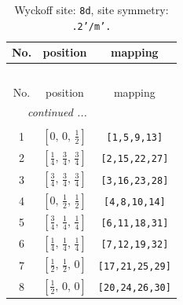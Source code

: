 \documentclass[fleqn,8pt]{jsarticle}
\begin{document}
\begin{longtable}{ccc}
\caption{Wyckoff site: {\tt 8d}, site symmetry: {\tt .2'/m'.}}
 \\
 \hline \hline
No. & position & mapping \\ \hline \endfirsthead

\multicolumn{2}{l}{\tablename\ \thetable{}} \\
 \hline \hline
No. & position & mapping \\ \hline \endhead

 \hline \hline
\multicolumn{2}{r}{\footnotesize\it continued ...} \\ \endfoot

 \hline \hline
\multicolumn{2}{r}{} \\ \endlastfoot

1 & $\left[ 0,\, 0,\, \frac{1}{2} \right]$ & {\tt [1,5,9,13]} \\ \hline
2 & $\left[ \frac{1}{4},\, \frac{3}{4},\, \frac{3}{4} \right]$ & {\tt [2,15,22,27]} \\ \hline
3 & $\left[ \frac{3}{4},\, \frac{3}{4},\, \frac{3}{4} \right]$ & {\tt [3,16,23,28]} \\ \hline
4 & $\left[ 0,\, \frac{1}{2},\, \frac{1}{2} \right]$ & {\tt [4,8,10,14]} \\ \hline
5 & $\left[ \frac{3}{4},\, \frac{1}{4},\, \frac{1}{4} \right]$ & {\tt [6,11,18,31]} \\ \hline
6 & $\left[ \frac{1}{4},\, \frac{1}{4},\, \frac{1}{4} \right]$ & {\tt [7,12,19,32]} \\ \hline
7 & $\left[ \frac{1}{2},\, \frac{1}{2},\, 0 \right]$ & {\tt [17,21,25,29]} \\ \hline
8 & $\left[ \frac{1}{2},\, 0,\, 0 \right]$ & {\tt [20,24,26,30]} \\
\end{longtable}
\renewcommand{\arraystretch}{1.2}
\end{document}
